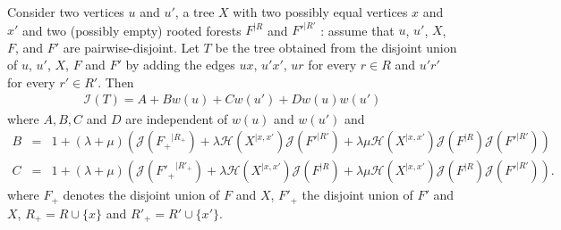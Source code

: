 \documentclass[11 pt]{modarticle}
\newcommand{\wmap}{w}
\newcommand{\rtree}[2]{{#1}^{\lvert #2}}
\newcommand{\indexsymbol}{\mathcal{I}}
\newcommand{\tindex}[1]{\indexsymbol(#1)}
\newcommand{\rindexsymbol}{\mathcal{J}}
\newcommand{\rindex}[2]{\rindexsymbol(\rtree{#2}{#1})}
\newcommand{\aindexsymbol}{\mathcal{H}}
\newcommand{\aindex}[3]{\aindexsymbol(\rtree{#3}{#1, #2})}
\begin{document}
\begin{lem}\label{lem:tindex-decomp-2}
Consider two vertices $u$ and $u'$, a tree $X$ with two possibly equal vertices $x$ and $x'$ and two (possibly empty) rooted forests $\rtree{F}{R}$ and $\rtree{F'}{R'}$ : assume that $u$, $u'$, $X$, $F$, and $F'$ are pairwise-disjoint. Let $T$ be the tree obtained from the disjoint union of $u$, $u'$, $X$, $F$ and $F'$ by adding the edges $ux$, $u'x'$, $ur$ for every $r \in R$ and $u'r'$ for every $r' \in R'$. Then
\begin{eqnarray*}
	\tindex{T} = A + B \wmap(u) + C \wmap(u') + D \wmap(u) \wmap(u')
\end{eqnarray*}
where $A,B,C$ and $D$ are independent of $\wmap(u)$ and $\wmap(u')$ and
\begin{eqnarray*}
	B & = & 1 + (\lambda + \mu) \left(\rindex{R_+}{F_+} + \lambda \aindex{x}{x'}{X} \rindex{R'}{F'} + \lambda \mu \aindex{x}{x'}{X} \rindex{R}{F} \rindex{R'}{F'}\right) \\
	C & = & 1 + (\lambda + \mu) \left(\rindex{R'_+}{F'_+} + \lambda \aindex{x}{x'}{X} \rindex{R}{F} + \lambda \mu \aindex{x}{x'}{X} \rindex{R}{F} \rindex{R'}{F'}\right) .
\end{eqnarray*}
where $F_+$ denotes the disjoint union of $F$ and $X$, $F'_+$ the disjoint union of $F'$ and $X$, $R_+ = R \cup \{x\}$ and $R'_+ = R' \cup \{x'\}$.
\end{lem}
\end{document}
